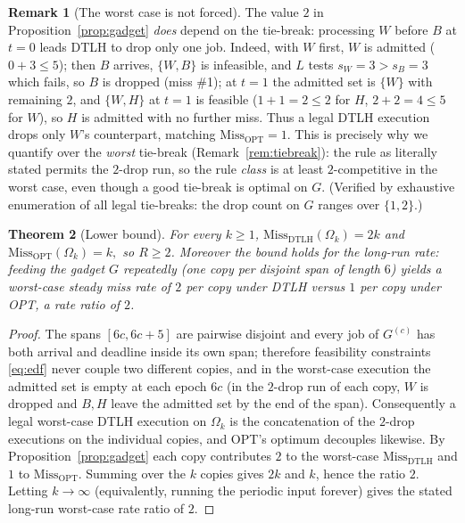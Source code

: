 \documentclass{amsart}
\newtheorem{theorem}{Theorem}
\theoremstyle{definition}
\newtheorem{remark}[theorem]{Remark}
\begin{document}
\begin{remark}[The worst case is not forced]\label{rem:Gnotforced}
The value $2$ in Proposition~\ref{prop:gadget} \emph{does} depend on the
tie-break: processing $W$ before $B$ at $t=0$ leads DTLH to drop only one job.
Indeed, with $W$ first, $W$ is admitted ($0+3\le5$); then $B$ arrives,
$\{W,B\}$ is infeasible, and $L$ tests $s_W=3>s_B=3$ which fails, so $B$ is
dropped (miss \#1); at $t=1$ the admitted set is $\{W\}$ with remaining $2$, and
$\{W,H\}$ at $t=1$ is feasible ($1+1=2\le2$ for $H$, $2+2=4\le5$ for $W$), so $H$
is admitted with no further miss. Thus a legal DTLH execution drops only $W$'s
counterpart, matching $\mathrm{Miss}_{\mathrm{OPT}}=1$. This is precisely why we
quantify over the \emph{worst} tie-break (Remark~\ref{rem:tiebreak}): the rule as
literally stated permits the $2$-drop run, so the rule \emph{class} is at least
$2$-competitive in the worst case, even though a good tie-break is optimal on
$G$. (Verified by exhaustive enumeration of all legal tie-breaks: the drop count
on $G$ ranges over $\{1,2\}$.)
\end{remark}

\begin{theorem}[Lower bound]\label{thm:lb}
For every $k\ge1$,
\(
\mathrm{Miss}_{\mathrm{DTLH}}(\Omega_k)=2k
\)
and
\(
\mathrm{Miss}_{\mathrm{OPT}}(\Omega_k)=k,
\)
so $R\ge 2$. Moreover the bound holds for the long-run \emph{rate}: feeding the
gadget $G$ repeatedly (one copy per disjoint span of length $6$) yields a
worst-case steady miss rate of $2$ per copy under DTLH versus $1$ per copy under
OPT, a rate ratio of $2$.
\end{theorem}

\begin{proof}
The spans $[6c,6c+5]$ are pairwise disjoint and every job of $G^{(c)}$ has both
arrival and deadline inside its own span; therefore feasibility constraints
\eqref{eq:edf} never couple two different copies, and in the worst-case execution
the admitted set is empty at each epoch $6c$ (in the $2$-drop run of each copy,
$W$ is dropped and $B,H$ leave the admitted set by the end of the span).
Consequently a legal worst-case DTLH execution on $\Omega_k$ is the
concatenation of the $2$-drop executions on the individual copies, and OPT's
optimum decouples likewise. By Proposition~\ref{prop:gadget} each copy
contributes $2$ to the worst-case $\mathrm{Miss}_{\mathrm{DTLH}}$ and $1$ to
$\mathrm{Miss}_{\mathrm{OPT}}$. Summing over the $k$ copies gives $2k$ and $k$,
hence the ratio $2$. Letting $k\to\infty$ (equivalently, running the periodic
input forever) gives the stated long-run worst-case rate ratio of $2$.
\end{proof}
\end{document}

